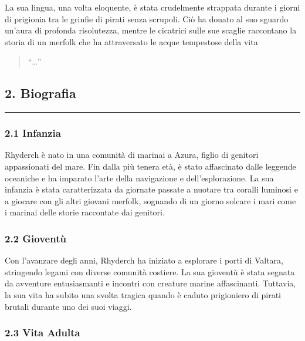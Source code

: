 La sua lingua, una volta eloquente, è stata crudelmente strappata
durante i giorni di prigionia tra le grinfie di pirati senza scrupoli.
Ciò ha donato al suo sguardo un'aura di profonda risolutezza, mentre le
cicatrici sulle sue scaglie raccontano la storia di un merfolk che ha
attraversato le acque tempestose della vita

\begin{quote}
``\ldots{}''
\end{quote}

\subsection{2. Biografia}\label{biografia}

\begin{center}\rule{0.5\linewidth}{0.5pt}\end{center}

\subsubsection{\texorpdfstring{2.1
\textbf{Infanzia}}{2.1 Infanzia}}\label{infanzia}

Rhyderch è nato in una comunità di marinai a Azura, figlio di genitori
appassionati del mare. Fin dalla più tenera età, è stato affascinato
dalle leggende oceaniche e ha imparato l'arte della navigazione e
dell'esplorazione. La sua infanzia è stata caratterizzata da giornate
passate a nuotare tra coralli luminosi e a giocare con gli altri giovani
merfolk, sognando di un giorno solcare i mari come i marinai delle
storie raccontate dai genitori.

\subsubsection{\texorpdfstring{2.2
\textbf{Gioventù}}{2.2 Gioventù}}\label{gioventuxf9}

Con l'avanzare degli anni, Rhyderch ha iniziato a esplorare i porti di
Valtara, stringendo legami con diverse comunità costiere. La sua
gioventù è stata segnata da avventure entusiasmanti e incontri con
creature marine affascinanti. Tuttavia, la sua vita ha subito una svolta
tragica quando è caduto prigioniero di pirati brutali durante uno dei
suoi viaggi.

\subsubsection{\texorpdfstring{2.3 \textbf{Vita
Adulta}}{2.3 Vita Adulta}}\label{vita-adulta}

